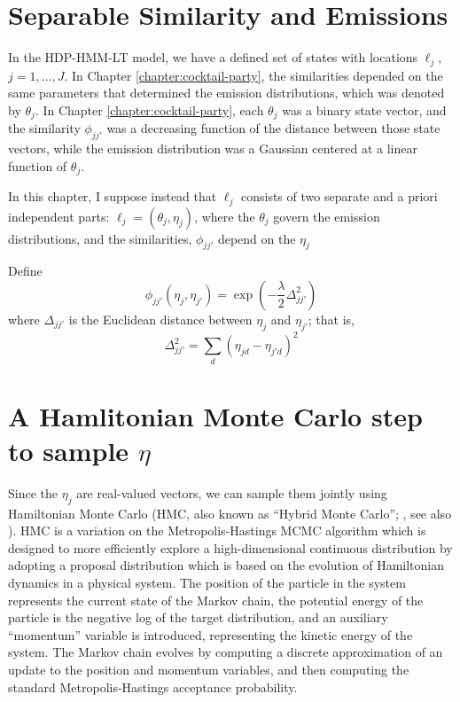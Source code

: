 \section{Separable Similarity and Emissions}
\label{sec:separ-simil-emiss}

In the HDP-HMM-LT model, we have a defined set of states with 
locations $\ell_j$, $j = 1, \dots,
J$.  In Chapter \ref{chapter:cocktail-party}, the similarities depended on the same parameters that determined the emission distributions, which was denoted by $\theta_j$.  In Chapter \ref{chapter:cocktail-party},
each $\theta_j$ was a binary state vector, and the similarity $\phi_{jj'}$ was a decreasing function of the distance between those state vectors, while the emission distribution was a Gaussian centered at a linear function of $\theta_j$.  %

In this chapter, I suppose instead that $\ell_{j}$ consists of two separate and a priori independent parts: $\ell_j = (\theta_{j}, \eta_{j})$, where the $\theta_j$ govern the emission distributions, and the similarities, $\phi_{jj'}$ depend on the $\eta_j$

Define
\begin{equation*}
  \phi_{jj'}(\eta_j, \eta_{j'}) = \exp\left(-\frac{\lambda}{2} \Delta_{jj'}^2\right)
\end{equation*}
where $\Delta_{jj'}$ is the Euclidean distance between $\eta_j$ and
$\eta_{j'}$; that is,
\begin{equation*}
  \Delta_{jj'}^2 = \sum_{d} (\eta_{jd} - \eta_{j'd})^2
\end{equation*}

\section{A Hamlitonian Monte Carlo step to sample $\eta$}
\label{sec:haml-monte-carlo}

Since the $\eta_j$ are real-valued vectors, we can sample them jointly using Hamiltonian Monte Carlo (HMC, also known as ``Hybrid Monte Carlo''; \citet{duane1987hybrid}, see also \citet{neal2011mcmc}).  HMC is a variation on the Metropolis-Hastings MCMC 
algorithm which is designed to more efficiently explore a high-dimensional continuous distribution by adopting a proposal distribution which is based on the evolution of Hamiltonian dynamics in a physical system.  The position of the particle in the system represents the current state of the Markov chain, the potential energy of the particle is the negative log of the target distribution, and an auxiliary ``momentum'' variable is introduced, representing the kinetic energy of the system.  The Markov chain evolves by computing a discrete approximation of an update to the position and momentum variables, and then computing the standard Metropolis-Hastings acceptance probability.


